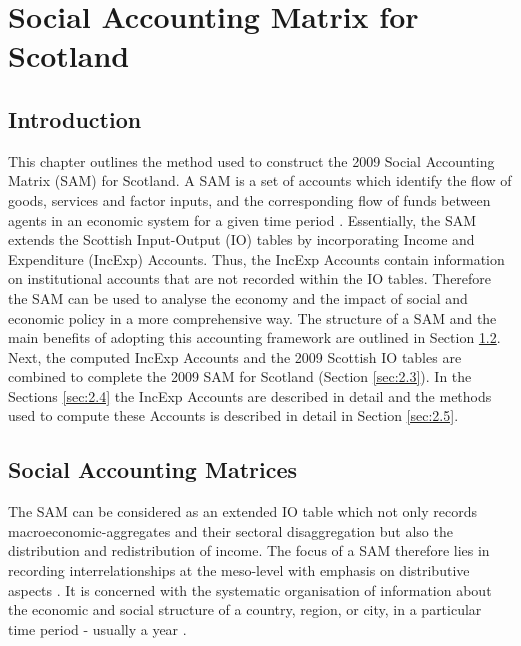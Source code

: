 \chapter{Social Accounting Matrix for Scotland}
\label{Chapter2}

\section{Introduction}
\label{sec:2.1}


This chapter outlines the method used to construct the 2009 Social Accounting Matrix (SAM) for Scotland. A SAM is a set of accounts which identify the flow of goods, services and factor inputs, and the corresponding flow of funds between agents in an economic system for a given time period \cite{Hosoe2010a}. Essentially, the SAM extends the Scottish Input-Output (IO) tables by incorporating Income and Expenditure (IncExp) Accounts. Thus, the IncExp Accounts contain information on institutional accounts that are not recorded within the IO tables. Therefore the SAM can be used to analyse the economy and the impact of social and economic policy in a more comprehensive way. The structure of a SAM and the main benefits of adopting this accounting framework are outlined in Section \ref{sec:2.2}. Next, the computed IncExp Accounts and the 2009 Scottish IO tables are combined to complete the 2009 SAM for Scotland (Section \ref{sec:2.3}). In the Sections \ref{sec:2.4} the IncExp Accounts are described in detail and the methods used to compute these Accounts is described in detail in Section \ref{sec:2.5}.

\newpage
\section{Social Accounting Matrices}
\label{sec:2.2}

The SAM can be considered as an extended IO table which not only records macroeconomic-aggregates and their sectoral disaggregation but also the distribution and redistribution of income. The focus of a SAM therefore lies in recording interrelationships at the meso-level with emphasis on distributive aspects \cite{Keuning1988a}. It is concerned with the systematic organisation of information about the economic and social structure of a country, region, or city, in a particular time period - usually a year \cite{King1981a}.

